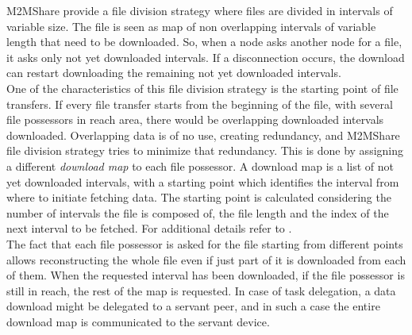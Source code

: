 M2MShare provide a file division strategy where files are divided in intervals of variable size. The file is seen as map of non overlapping intervals of variable length that need to be downloaded. So, when a node asks another node for a file, it asks only not yet downloaded intervals. If a disconnection occurs, the download can restart downloading the remaining not yet downloaded intervals.
\\

One of the characteristics of this file division strategy is the starting point of file transfers. If every file transfer starts from the beginning of the file, with several file possessors in reach area, there would be overlapping downloaded intervals downloaded. Overlapping data is of no use, creating redundancy, and M2MShare file division strategy tries to minimize that redundancy. This is done by assigning a different \textit{download map} to each file possessor. A download map is a list of not yet downloaded intervals, with a starting point which identifies the interval from where to initiate fetching data. The starting point is calculated considering the number of intervals the file is composed of, the file length and the index of the next interval to be fetched. For additional details refer to \cite{tesiarmir}.
\\

The fact that each file possessor is asked for the file starting from different points allows reconstructing the whole file even if just part of it is downloaded from each of them. When the requested interval has been downloaded, if the file possessor is still in reach, the rest of the map is requested. In case of task delegation, a data download might be delegated to a servant peer, and in such a case the entire download map is communicated to the servant device.
 
 


